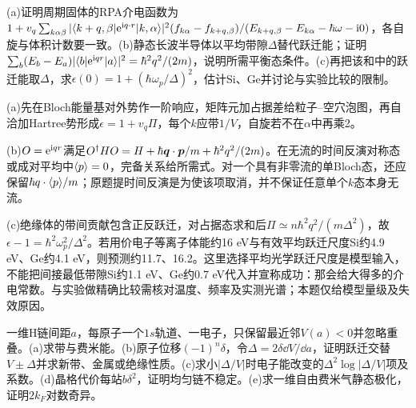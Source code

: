 \begin{exercise}[原题2(a)--(c)]\label{p:512-2-2}
(a)证明周期固体的RPA介电函数为$1+v_q\sum_{k\alpha\beta}|\langle k+q,\beta|\mathrm e^{\mathrm i q\cdot r}|k,\alpha\rangle|^2(f_{k\alpha}-f_{k+q,\beta})/(E_{k+q,\beta}-E_{k\alpha}-\hbar\omega-\mathrm i0)$，各自旋与体积计数要一致。(b)静态长波半导体以平均带隙$\Delta$替代跃迁能；证明$\sum_b(E_b-E_a)|\langle b|\mathrm e^{\mathrm i q r}|a\rangle|^2=\hbar^2q^2/(2m)$，说明所需平衡态条件。(c)再把该和中的跃迁能取$\Delta$，求$\epsilon(0)=1+(\hbar\omega_p/\Delta)^2$，估计Si、Ge并讨论与实验比较的限制。
\end{exercise}
\begin{solution}
(a)先在Bloch能量基对外势作一阶响应，矩阵元加占据差给粒子--空穴泡图，再自洽加Hartree势形成$\epsilon=1+v_q\Pi$，每个$k$应带$1/V$，自旋若不在$\alpha$中再乘2。

(b)$O=\mathrm e^{\mathrm i q r}$满足$O^\dagger HO=H+\hbar\boldsymbol{q}\cdot\boldsymbol{p}/m+\hbar^2q^2/(2m)$。在无流的时间反演对称态或成对平均中$\langle p\rangle=0$，完备关系给所需式。对一个具有非零流的单Bloch态，还应保留$\hbar q\cdot\langle p\rangle/m$；原题提时间反演是为使该项取消，并不保证任意单个$k$态本身无流。

(c)绝缘体的带间贡献包含正反跃迁，对占据态求和后$\Pi\simeq n\hbar^2q^2/(m\Delta^2)$，故$\epsilon-1=\hbar^2\omega_p^2/\Delta^2$。若用价电子等离子体能约16 eV与有效平均跃迁尺度Si约4.9 eV、Ge约4.1 eV，则预测约11.7、16.2。这里选择平均光学跃迁尺度是模型输入，不能把间接最低带隙Si约1.1 eV、Ge约0.7 eV代入并宣称成功：那会给大得多的介电常数。与实验做精确比较需核对温度、频率及实测光谱；本题仅给模型量级及失效原因。
\end{solution}
\begin{exercise}[原题1(a)--(e)]\label{p:512-3-1}
一维H链间距$a$，每原子一个$1s$轨道、一电子，只保留最近邻$V(a)<0$并忽略重叠。(a)求带与费米能。(b)原子位移$(-1)^n\delta$，令$\Delta=2\delta\dd V/\dd a$，证明跃迁交替$V\pm\Delta$并求新带、金属或绝缘性质。(c)求小$|\Delta/V|$时电子能改变的$\Delta^2\log|\Delta/V|$项及系数。(d)晶格代价每站$b\delta^2$，证明均匀链不稳定。(e)求一维自由费米气静态极化，证明$2k_F$对数奇异。
\end{exercise}
